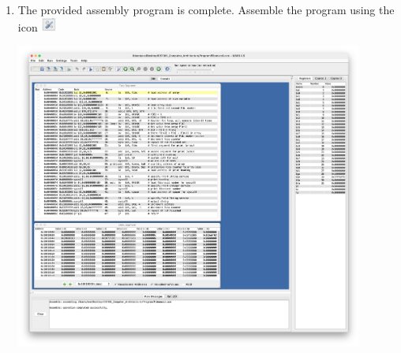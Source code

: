 \documentclass[12pt]{article}
\begin{document}
\begin{enumerate}
  \newpage
    \item The provided assembly program is complete. Assemble the program using the icon \includegraphics[width=0.04\textwidth]{5.png} 
    \begin{center}
        \includegraphics[width=0.9\textwidth]{6.png} 
    \end{center}


\end{enumerate}
\end{document}
